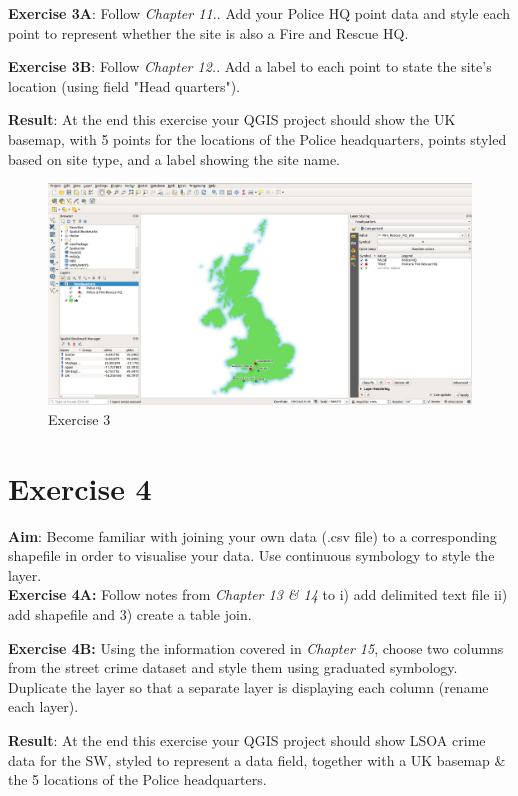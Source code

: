 \documentclass{article}
\begin{document}
\textbf{Exercise 3A}: Follow \emph{Chapter 11.}. Add your Police HQ point data and style each point to represent whether the site is also a Fire and Rescue HQ. 

\textbf{Exercise 3B}: Follow \emph{Chapter 12.}. Add a label to each point to state the site's location (using field "Head quarters").

\textbf{Result}: At the end this exercise your QGIS project should show the UK basemap, with 5 points for the locations of the Police headquarters, points styled based on site type, and a label showing the site name.\\


\begin{figure}[!h]
	\centering
	\includegraphics[width=1\textwidth]{images/exercise_3.png}
	\caption{Exercise 3}
	\label{ft_fig_firstfig3}
\end{figure}

\newpage
\section{Exercise 4}

\textbf{Aim}: Become familiar with joining your own data (.csv file) to a corresponding shapefile in order to visualise your data. Use continuous symbology to style the layer.\\

\textbf{Exercise 4A:} Follow notes from \emph{Chapter 13 \& 14} to i) add delimited text file ii) add shapefile and 3) create a table join.

\textbf{Exercise 4B:} Using the information covered in \emph{Chapter 15}, choose two columns from the street crime dataset and style them using graduated symbology. Duplicate the layer so that a separate layer is displaying each column (rename each layer).

\textbf{Result}: At the end this exercise your QGIS project should show LSOA crime data for the SW, styled to represent a data field, together with a UK basemap \& the 5 locations of the Police headquarters. 
\\
\end{document}
